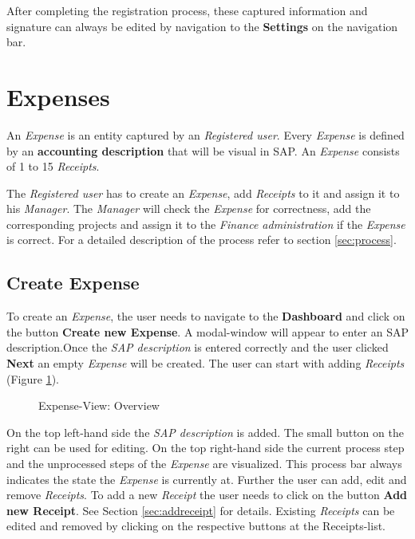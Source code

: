 After completing the registration process, these captured information and signature can always be edited by navigation to the \textbf{Settings} on the navigation bar.
\clearpage

\section{Expenses}

An \textit{Expense} is an entity captured by an \textit{Registered user}. Every \textit{Expense} is defined by an \textbf{accounting description} that will be visual in SAP. An \textit{Expense} consists of 1 to 15 \textit{Receipts}.

The \textit{Registered user} has to create an \textit{Expense}, add \textit{Receipts} to it and assign it to his \textit{Manager}. The \textit{Manager} will check the \textit{Expense} for correctness, add the corresponding projects and assign it to the \textit{Finance administration} if the \textit{Expense} is correct. For a detailed description of the process refer to section \ref{sec:process}.

\subsection{Create Expense}

To create an \textit{Expense}, the user needs to navigate to the \textbf{Dashboard} and click on the button \textbf{Create new Expense}. A modal-window will appear to enter an SAP description.\newline Once the \textit{SAP description} is entered correctly and the user clicked \textbf{Next} an empty \textit{Expense} will be created. The user can start with adding \textit{Receipts} (Figure \ref{fig:expensesitems-overview}).

\begin{figure}[H]
    \centering
    \caption{Expense-View: Overview}
    \label{fig:expensesitems-overview}
\end{figure}

On the top left-hand side the \textit{SAP description} is added. The small button on the right can be used for editing. On the top right-hand side the current process step and the unprocessed steps of the \textit{Expense} are visualized. This process bar always indicates the state the \textit{Expense} is currently at.\newline
Further the user can add, edit and remove \textit{Receipts}. To add a new \textit{Receipt} the user needs to click on the button \textbf{Add new Receipt}. See Section \ref{sec:addreceipt} for details.\newline
Existing \textit{Receipts} can be edited and removed by clicking on the respective buttons at the Receipts-list.


